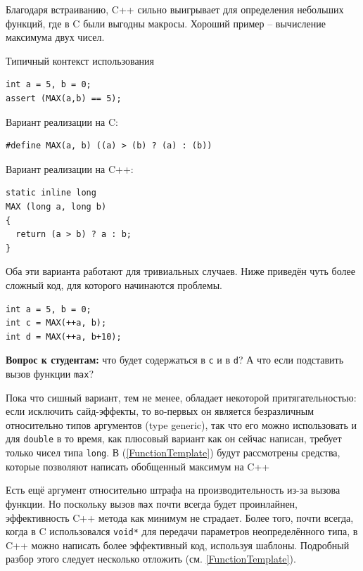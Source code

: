 \documentclass[a4paper,12pt,oneside]{article}
\newif\ifanswers
\begin{document}
Благодаря встраиванию, C++ сильно выигрывает для определения небольших функций, где в C были выгодны макросы. Хороший пример -- вычисление максимума двух чисел.

Типичный контекст использования

\begin{lstlisting}
int a = 5, b = 0;
assert (MAX(a,b) == 5);
\end{lstlisting}

Вариант реализации на C:

\begin{lstlisting}
#define MAX(a, b) ((a) > (b) ? (a) : (b))
\end{lstlisting}

Вариант реализации на C++:

\begin{lstlisting}
static inline long
MAX (long a, long b)
{
  return (a > b) ? a : b;
} 
\end{lstlisting}

Оба эти варианта работают для тривиальных случаев. Ниже приведён чуть более сложный код, для которого начинаются проблемы.

\begin{lstlisting}
int a = 5, b = 0;
int c = MAX(++a, b);
int d = MAX(++a, b+10);
\end{lstlisting}

\textbf{Вопрос к студентам:} что будет содержаться в \lstinline!c! и в \lstinline!d!? А что если подставить вызов функции \lstinline!max!? 

\ifanswers
Правильный ответ: макрос раскроется как \lstinline!((++a) > (b) ? (++a) : (b))! то есть в сишной версии \lstinline!a! будет инкрементирована дважды. В C++ версии всё норм.
\fi

Пока что сишный вариант, тем не менее, обладает некоторой притягательностью: если исключить сайд-эффекты, то во-первых он является безразличным относительно типов аргументов (type generic), так что его можно использовать и для \lstinline!double! в то время, как плюсовый вариант как он сейчас написан, требует только чисел типа \lstinline!long!. В (\ref{FunctionTemplate}) будут рассмотрены средства, которые позволяют написать обобщенный максимум на C++

Есть ещё аргумент относительно штрафа на производительность из-за вызова функции. Но поскольку вызов \lstinline!max! почти всегда будет проинлайнен, эффективность C++ метода как минимум не страдает. Более того, почти всегда, когда в C использовался \lstinline!void*! для передачи параметров неопределённого типа, в C++ можно написать более эффективный код, используя шаблоны. Подробный разбор этого следует несколько отложить (см. \ref{FunctionTemplate}).
\end{document}

